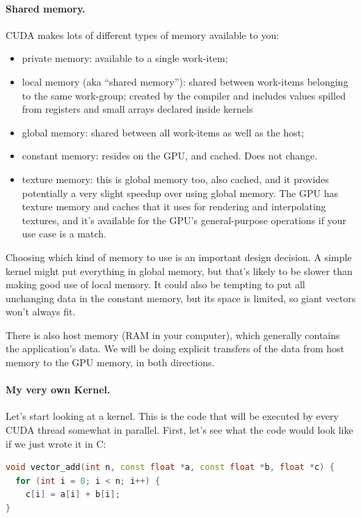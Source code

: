 \documentclass[a4paper]{report}
\newcommand{\CPP}{C\nolinebreak\hspace{-.05em}\raisebox{.4ex}{\tiny\bf +}\nolinebreak\hspace{-.10em}\raisebox{.4ex}{\tiny\bf +}}
\def\CPP{{C\nolinebreak[4]\hspace{-.05em}\raisebox{.4ex}{\tiny\bf ++}}}
\begin{document}
\paragraph{Shared memory.} CUDA makes lots of different types of
memory available to you:

\begin{itemize}
\item private memory: available to a single work-item;
\item local memory (aka ``shared memory''): shared between work-items
  belonging to the same work-group; created by the compiler and includes values spilled from registers and small arrays declared inside kernels~\cite{micikevicius11:_local_memor_regis_spill}
\item global memory: shared between all work-items as well as the host;
\item constant memory: resides on the GPU, and cached. Does not change.
\item texture memory: this is global memory too, also cached, and it provides potentially a very slight speedup over using global memory. The GPU has texture memory and caches that it uses for rendering and interpolating textures, and it's available for the GPU's general-purpose operations if your use case is a match. 
\end{itemize}

Choosing which kind of memory to use is an important design decision. A simple kernel might put everything in global memory, but that's likely to be slower than making good use of local memory. It could also be tempting to put all unchanging data in the constant memory, but its space is limited, so giant vectors won't always fit.

There is also host memory (RAM in your computer), which generally contains the application's data. We will be doing explicit transfers of the data from host memory to the GPU memory, in both directions.

\paragraph{My very own Kernel.} Let's start looking at a kernel. This is the code that will be executed by every CUDA thread somewhat in parallel. First, let's see what the code would look like if we just wrote it in \CPP:

\begin{lstlisting}[language=C++]
void vector_add(int n, const float *a, const float *b, float *c) {
  for (int i = 0; i < n; i++) {
    c[i] = a[i] + b[i];
}
\end{lstlisting}
\end{document}
